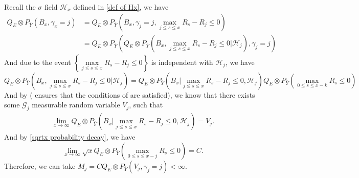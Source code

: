 \documentclass[]{article}
\makeatletter
\numberwithin{equation}{section}
\renewenvironment{proof}[1][\proofname]{%
	\par\pushQED{\qed}\normalfont%
	\topsep6\p@\@plus6\p@\relax
	\trivlist\item[\hskip\labelsep\bfseries#1\@addpunct{.}]%
	\ignorespaces
}{%
	\popQED\endtrivlist\@endpefalse
}
\theoremstyle{thmstyleone}%
\theoremstyle{thmstyletwo}%
\theoremstyle{thmstylethree}%
\theoremstyle{thmstylefour}%
\theoremstyle{thmstylefive}%
\theoremstyle{thmstylesix}%
\makeatother
\begin{document}
	\begin{proof}[Proof of \Cref{intermediately lemma}]
		Recall the $\sigma$ field $\mathcal{H}_x$ defined in \cref{def of Hx}, we have
		\begin{align}
			Q_E\otimes P_{\overline{Y}}
			\left( B_x,\gamma_x = j
			\right)
			&=
			Q_E\otimes P_{\overline{Y}}
			\left( B_x,\gamma_j = j, \max_{j \leqslant s\leqslant x} R_s-R_j \leqslant 0
			\right)
			\nonumber\\
			&=
			Q_E\otimes P_{\overline{Y}}\left(
			Q_E\otimes P_{\overline{Y}} \left( B_x,\max_{ j \leqslant s\leqslant x} R_s-R_j \leqslant 0 \bigg| \mathcal{H}_j
			\right),\gamma_j=j \right)\nonumber
		\end{align}
		And due to the event $\left\{\max\limits_{ j \leqslant s\leqslant x} R_s-R_j \leqslant 0\right\}$ is independent with $\mathcal{H}_j$, we have
		\begin{equation*}
			Q_E\otimes P_{\overline{Y}}
			\left( B_x, \max_{ j \leqslant s\leqslant x} R_s-R_j \leqslant 0\bigg| \mathcal{H}_j
			\right)
			=
			Q_E\otimes P_{\overline{Y}}
			\left( B_x\bigg| \max_{ j \leqslant s\leqslant x} R_s-R_j \leqslant 0, \mathcal{H}_j
			\right)
			Q_E\otimes P_{\overline{Y}} \left(
			\max_{0 \leqslant s\leqslant x-k} R_s \leqslant 0
			\right)
		\end{equation*}
		And by  ( ensures that the conditions of  are satisfied), we know that there exists some $\mathcal{G}_j$ measurable random variable $V_j$, such that
		\begin{align}
			\lim\limits_{x\rightarrow\infty}Q_E\otimes P_{\overline{Y}}
			\left( B_x \bigg| \max_{ j \leqslant s\leqslant x} R_s-R_j \leqslant 0, \mathcal{H}_j
			\right)=V_j.
		\end{align}
		And by \cref{sqrtx probability decay}, we have
		\begin{equation*}
			\lim\limits_{x\rightarrow\infty}\sqrt{x} Q_E\otimes P_{\overline{Y}} \left(
			\max_{0 \leqslant s\leqslant x-j} R_s \leqslant 0
			\right) = C.
		\end{equation*}
		Therefore, we can take $M_j = C Q_E\otimes P_{\overline{Y}}
		\left(
		V_j, \gamma_j = j
		\right)<\infty$.
		

\end{proof}
\end{document}
